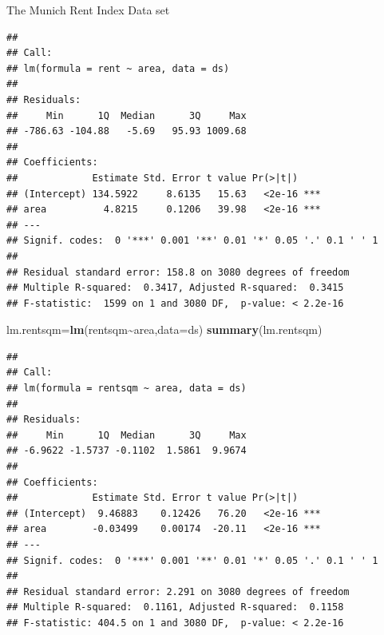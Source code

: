 \documentclass[
  ignorenonframetext,
]{beamer}
\newenvironment{Shaded}{\begin{snugshade}}{\end{snugshade}}
\newcommand{\AttributeTok}[1]{\textcolor[rgb]{0.13,0.29,0.53}{#1}}
\newcommand{\FunctionTok}[1]{\textcolor[rgb]{0.13,0.29,0.53}{\textbf{#1}}}
\newcommand{\NormalTok}[1]{#1}
\newcommand{\OtherTok}[1]{\textcolor[rgb]{0.56,0.35,0.01}{#1}}
\newcommand{\SpecialCharTok}[1]{\textcolor[rgb]{0.81,0.36,0.00}{\textbf{#1}}}
\begin{document}
\begin{frame}[fragile]
\begin{block}{The Munich Rent Index Data set}
\begin{verbatim}
## 
## Call:
## lm(formula = rent ~ area, data = ds)
## 
## Residuals:
##     Min      1Q  Median      3Q     Max 
## -786.63 -104.88   -5.69   95.93 1009.68 
## 
## Coefficients:
##             Estimate Std. Error t value Pr(>|t|)    
## (Intercept) 134.5922     8.6135   15.63   <2e-16 ***
## area          4.8215     0.1206   39.98   <2e-16 ***
## ---
## Signif. codes:  0 '***' 0.001 '**' 0.01 '*' 0.05 '.' 0.1 ' ' 1
## 
## Residual standard error: 158.8 on 3080 degrees of freedom
## Multiple R-squared:  0.3417, Adjusted R-squared:  0.3415 
## F-statistic:  1599 on 1 and 3080 DF,  p-value: < 2.2e-16
\end{verbatim}

\begin{Shaded}
\begin{Highlighting}[]
\NormalTok{lm.rentsqm}\OtherTok{=}\FunctionTok{lm}\NormalTok{(rentsqm}\SpecialCharTok{\textasciitilde{}}\NormalTok{area,}\AttributeTok{data=}\NormalTok{ds)}
\FunctionTok{summary}\NormalTok{(lm.rentsqm)}
\end{Highlighting}
\end{Shaded}

\begin{verbatim}
## 
## Call:
## lm(formula = rentsqm ~ area, data = ds)
## 
## Residuals:
##     Min      1Q  Median      3Q     Max 
## -6.9622 -1.5737 -0.1102  1.5861  9.9674 
## 
## Coefficients:
##             Estimate Std. Error t value Pr(>|t|)    
## (Intercept)  9.46883    0.12426   76.20   <2e-16 ***
## area        -0.03499    0.00174  -20.11   <2e-16 ***
## ---
## Signif. codes:  0 '***' 0.001 '**' 0.01 '*' 0.05 '.' 0.1 ' ' 1
## 
## Residual standard error: 2.291 on 3080 degrees of freedom
## Multiple R-squared:  0.1161, Adjusted R-squared:  0.1158 
## F-statistic: 404.5 on 1 and 3080 DF,  p-value: < 2.2e-16
\end{verbatim}


\end{block}
\end{frame}
\end{document}

